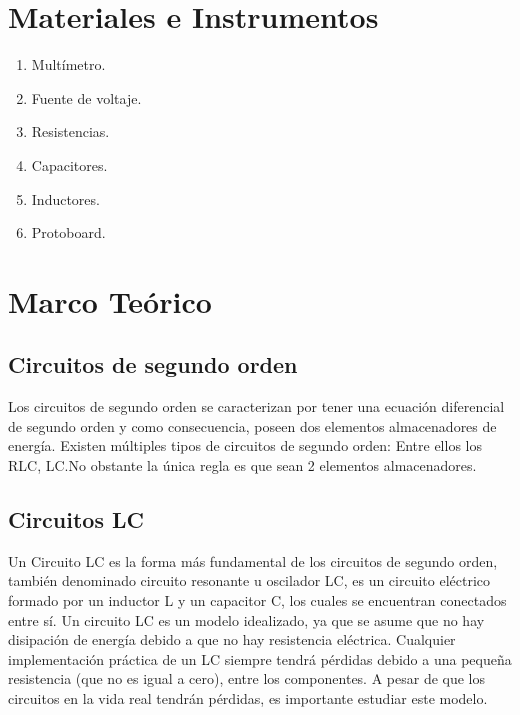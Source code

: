 \documentclass{article}
\begin{document}
    \section{Materiales e Instrumentos}

    \begin{enumerate}
        \item Multímetro.
        \item Fuente de voltaje.
        \item Resistencias.
        \item Capacitores.
        \item Inductores.
        \item Protoboard.
    \end{enumerate}

    \section{Marco Teórico}

    \subsection{Circuitos de segundo orden}

    Los circuitos de segundo orden se caracterizan por tener una ecuación diferencial de segundo orden y como consecuencia, poseen dos elementos almacenadores de energía. Existen múltiples tipos de circuitos de segundo orden: Entre ellos los RLC, LC.\@ No obstante la única regla es que sean 2 elementos almacenadores.

    \subsection{Circuitos LC}

    
    Un Circuito LC es la forma más fundamental de los circuitos de segundo orden, también denominado circuito resonante u oscilador LC, es un circuito eléctrico formado por un inductor L y un capacitor C, los cuales se encuentran conectados entre sí. Un circuito LC es un modelo idealizado, ya que se asume que no hay disipación de energía debido a que no hay resistencia eléctrica. Cualquier implementación práctica de un LC siempre tendrá pérdidas debido a una pequeña resistencia (que no es igual a cero), entre los componentes. A pesar de que los circuitos en la vida real tendrán pérdidas, es importante estudiar este modelo.
    
    
\end{document}
